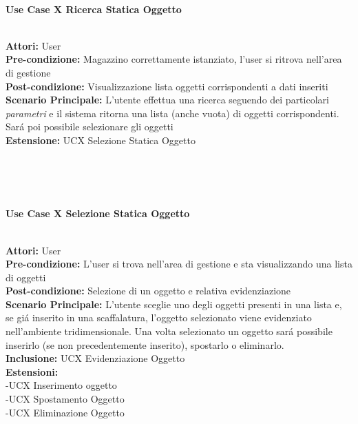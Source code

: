 \vspace{0.5cm}

\Large\textbf{}\\
\Large\textbf{Use Case X Ricerca Statica Oggetto} \\
\vspace{0.5cm}

\large\textbf{} \\
\textbf{Attori:} User\\
\textbf{Pre-condizione:} Magazzino correttamente istanziato, l'user si ritrova nell'area di gestione \\
\textbf{Post-condizione: } Visualizzazione lista oggetti corrispondenti a dati inseriti\\
\textbf{Scenario Principale:}  L'utente effettua una ricerca seguendo dei particolari \textit{parametri} e il sistema ritorna una lista (anche vuota) di oggetti corrispondenti. Sará poi possibile selezionare gli oggetti\\
\textbf{Estensione:} UCX Selezione Statica Oggetto

\textbf{}\\
{}\\

\vspace{0.5cm}

\Large\textbf{}\\
\Large\textbf{Use Case X Selezione Statica Oggetto} \\

\vspace{0.5cm}

\large\textbf{} \\
\textbf{Attori:} User\\
\textbf{Pre-condizione:} L'user si trova nell'area di gestione e sta visualizzando una lista di oggetti \\
\textbf{Post-condizione: } Selezione di un oggetto e relativa evidenziazione\\
\textbf{Scenario Principale:}  L'utente sceglie uno degli oggetti presenti in una lista e, se giá inserito in una scaffalatura, l'oggetto selezionato viene evidenziato nell'ambiente tridimensionale. Una volta selezionato un oggetto sará possibile inserirlo (se non precedentemente inserito), spostarlo o eliminarlo.\\
\textbf{Inclusione:} UCX Evidenziazione Oggetto \\
\textbf{Estensioni:} \\ 
-UCX Inserimento oggetto \\ -UCX Spostamento Oggetto \\ -UCX Eliminazione Oggetto

